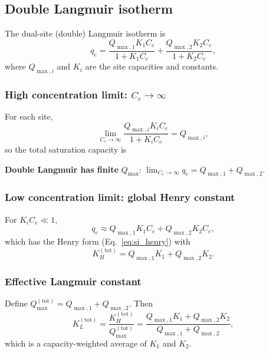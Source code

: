\documentclass[journal=aamick,manuscript=article]{achemso}
\begin{document}
\subsection{Double Langmuir isotherm}
\label{sec:si_double_langmuir}

The dual-site (double) Langmuir isotherm is
\begin{equation}
	q_e
	= \frac{Q_{\max,1} K_1 C_e}{1 + K_1 C_e}
	+ \frac{Q_{\max,2} K_2 C_e}{1 + K_2 C_e},
	\label{eq:si_double_langmuir}
\end{equation}
where \(Q_{\max,i}\) and \(K_i\) are the site capacities and constants.

\subsubsection{High concentration limit: \(C_e \to \infty\)}

For each site,
\begin{equation}
	\lim_{C_e \to \infty} \frac{Q_{\max,i} K_i C_e}{1 + K_i C_e}
	= Q_{\max,i},
\end{equation}
so the total saturation capacity is

\textbf{Double Langmuir has finite }$Q_{\max}$:\quad
$\displaystyle \lim_{C_e \to \infty} q_e = Q_{\max,1} + Q_{\max,2}$.

\subsubsection{Low concentration limit: global Henry constant}

For \(K_i C_e \ll 1\),
\begin{equation}
	q_e \approx Q_{\max,1} K_1 C_e + Q_{\max,2} K_2 C_e,
\end{equation}
which has the Henry form (Eq.~\eqref{eq:si_henry}) with
\begin{equation}
	K_H^{\mathrm{(tot)}}
	= Q_{\max,1} K_1 + Q_{\max,2} K_2.
\end{equation}

\subsubsection{Effective Langmuir constant}

Define \(Q_{\max}^{\mathrm{(tot)}} = Q_{\max,1} + Q_{\max,2}\). Then
\begin{equation}
	K_L^{\mathrm{(tot)}}
	= \frac{K_H^{\mathrm{(tot)}}}{Q_{\max}^{\mathrm{(tot)}}}
	= \frac{Q_{\max,1} K_1 + Q_{\max,2} K_2}
	{Q_{\max,1} + Q_{\max,2}},
\end{equation}
which is a capacity-weighted average of \(K_1\) and \(K_2\).
\end{document}
